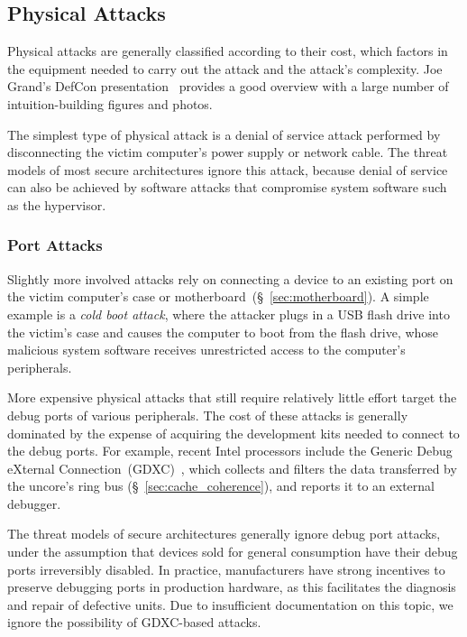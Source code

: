 \subsection{Physical Attacks}
\label{sec:physical_attacks}

Physical attacks are generally classified according to their cost, which
factors in the equipment needed to carry out the attack and the attack's
complexity. Joe Grand's DefCon presentation~\cite{grand2004physicalattacks}
provides a good overview with a large number of intuition-building figures and
photos.

The simplest type of physical attack is a denial of service attack performed by
disconnecting the victim computer's power supply or network cable. The threat
models of most secure architectures ignore this attack, because denial of
service can also be achieved by software attacks that compromise system
software such as the hypervisor.


\subsubsection{Port Attacks}
\label{sec:physical_port_attacks}

Slightly more involved attacks rely on connecting a device to an existing port
on the victim computer's case or motherboard~(\S~\ref{sec:motherboard}). A
simple example is a \textit{cold boot attack}, where the attacker plugs in a
USB flash drive into the victim's case and causes the computer to boot from
the flash drive, whose malicious system software receives unrestricted access
to the computer's peripherals.

More expensive physical attacks that still require relatively little effort
target the debug ports of various peripherals. The cost of these attacks is
generally dominated by the expense of acquiring the development kits needed to
connect to the debug ports. For example, recent Intel processors include the
Generic Debug eXternal Connection~(GDXC)~\cite{yuffe2011sandybridge,
intel2011gdxc}, which collects and filters the data transferred by the uncore's
ring bus (\S~\ref{sec:cache_coherence}), and reports it to an external
debugger.

The threat models of secure architectures generally ignore debug port attacks,
under the assumption that devices sold for general consumption have their debug
ports irreversibly disabled. In practice, manufacturers have strong incentives
to preserve debugging ports in production hardware, as this facilitates the
diagnosis and repair of defective units. Due to insufficient documentation on
this topic, we ignore the possibility of GDXC-based attacks.


